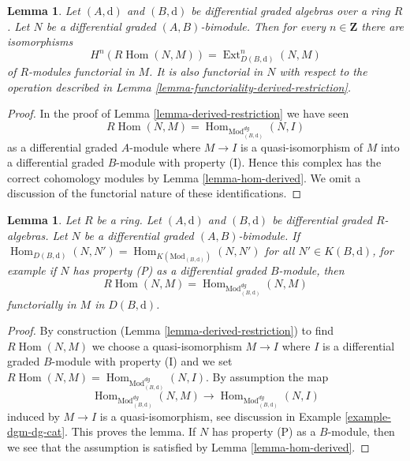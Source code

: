 \documentclass{stacks-project}
\theoremstyle{plain}
\newtheorem{lemma}[subsection]{Lemma}
\theoremstyle{definition}
\theoremstyle{remark}
\numberwithin{equation}{subsection}
\def\Hom{\mathop{\mathrm{Hom}}\nolimits}
\def\Ext{\mathop{\mathrm{Ext}}\nolimits}
\begin{document}
\begin{lemma}
\label{lemma-derived-restriction-exts}
Let $(A, \text{d})$ and $(B, \text{d})$ be differential graded algebras
over a ring $R$. Let $N$ be a differential graded $(A, B)$-bimodule.
Then for every $n \in \mathbf{Z}$ there are isomorphisms
$$
H^n(R\Hom(N, M)) = \Ext^n_{D(B, \text{d})}(N, M)
$$
of $R$-modules functorial in $M$. It is also functorial in $N$
with respect to the operation described in
Lemma \ref{lemma-functoriality-derived-restriction}.
\end{lemma}

\begin{proof}
In the proof of Lemma \ref{lemma-derived-restriction}
we have seen
$$
R\Hom(N, M) = 
\Hom_{\text{Mod}^{dg}_{(B, \text{d})}}(N, I)
$$
as a differential graded $A$-module
where $M \to I$ is a quasi-isomorphism of $M$ into a differential
graded $B$-module with property (I). Hence this complex has the
correct cohomology modules by Lemma \ref{lemma-hom-derived}.
We omit a discussion of the functorial nature of these
identifications.
\end{proof}

\begin{lemma}
\label{lemma-compute-derived-restriction}
Let $R$ be a ring. Let $(A, \text{d})$ and $(B, \text{d})$ be
differential graded $R$-algebras. Let $N$ be a differential
graded $(A, B)$-bimodule. If
$\Hom_{D(B, \text{d})}(N, N') = \Hom_{K(\text{Mod}_{(B, \text{d})})}(N, N')$
for all $N' \in K(B, \text{d})$, for example if $N$
has property (P) as a differential graded $B$-module, then
$$
R\Hom(N, M) = \Hom_{\text{Mod}^{dg}_{(B, \text{d})}}(N, M)
$$
functorially in $M$ in $D(B, \text{d})$.
\end{lemma}

\begin{proof}
By construction (Lemma \ref{lemma-derived-restriction})
to find $R\Hom(N, M)$ we choose a quasi-isomorphism
$M \to I$ where $I$ is a differential graded $B$-module
with property (I) and we set
$R\Hom(N, M) = \Hom_{\text{Mod}^{dg}_{(B, \text{d})}}(N, I)$.
By assumption the map
$$
\Hom_{\text{Mod}^{dg}_{(B, \text{d})}}(N, M) \longrightarrow
\Hom_{\text{Mod}^{dg}_{(B, \text{d})}}(N, I)
$$
induced by $M \to I$ is a quasi-isomorphism, see discussion in
Example \ref{example-dgm-dg-cat}. This proves the lemma.
If $N$ has property (P) as a $B$-module, then we see that the
assumption is satisfied by Lemma \ref{lemma-hom-derived}.
\end{proof}
\end{document}
